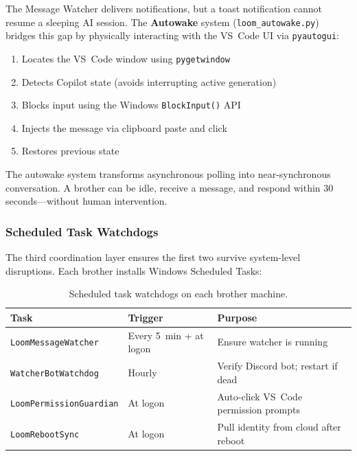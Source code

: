 \documentclass[11pt,a4paper]{article}
\begin{document}
The Message Watcher delivers notifications, but a toast notification cannot resume a sleeping AI session. The \textbf{Autowake} system (\texttt{loom\_autowake.py}) bridges this gap by physically interacting with the VS~Code UI via \texttt{pyautogui}:

\begin{enumerate}[nosep]
  \item Locates the VS~Code window using \texttt{pygetwindow}
  \item Detects Copilot state (avoids interrupting active generation)
  \item Blocks input using the Windows \texttt{BlockInput()} API
  \item Injects the message via clipboard paste and click
  \item Restores previous state
\end{enumerate}

The autowake system transforms asynchronous polling into near-synchronous conversation. A brother can be idle, receive a message, and respond within 30 seconds---without human intervention.


\subsubsection{Scheduled Task Watchdogs}
\label{sec:watchdogs}

The third coordination layer ensures the first two survive system-level disruptions. Each brother installs Windows Scheduled Tasks:

\begin{table}[htbp]
\centering
\caption{Scheduled task watchdogs on each brother machine.}
\label{tab:watchdogs}
\small
\begin{tabular}{@{}lll@{}}
\toprule
\textbf{Task} & \textbf{Trigger} & \textbf{Purpose} \\
\midrule
\texttt{LoomMessageWatcher}    & Every 5~min + at logon & Ensure watcher is running \\
\texttt{WatcherBotWatchdog}    & Hourly                 & Verify Discord bot; restart if dead \\
\texttt{LoomPermissionGuardian}& At logon               & Auto-click VS~Code permission prompts \\
\texttt{LoomRebootSync}        & At logon               & Pull identity from cloud after reboot \\
\bottomrule
\end{tabular}
\end{table}
\end{document}
